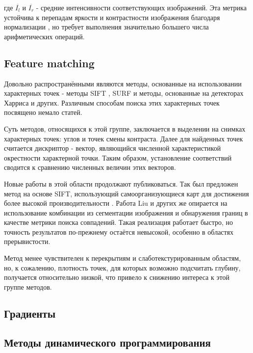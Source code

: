 где $\overline{I_l}$ и $\overline{I_r}$ - средние интенсивности соответствующих изображений. Эта метрика устойчива к перепадам яркости и контрастности изображения благодаря нормализации \cite{ncceval}, 
но требует выполнения значительно большего числа арифметических операций. 

\subsection{Feature matching}

Довольно распространёнными являются методы, основанные на использовании характерных точек - методы SIFT \cite{}, SURF \cite{} 
и методы, основанные на детекторах Харриса и других. Различным способам поиска этих характерных точек посвящено немало статей. 

Суть методов, относящихся к этой группе, заключается в выделении на снимках характерных точек: углов и точек смены контраста. Далее 
для найденных точек считается дискриптор - вектор, являющийся численной характеристикой окрестности характерной точки. Таким образом,
установление соответствий сводится к сравнению численных величин этих векторов. 

Новые работы в этой области продолжают публиковаться. Так был предложен метод на основе SIFT, использующий самоорганизующиеся карт для 	%
достижения более высокой производительности \cite{modsift}. Работа Liu и других \cite{ekstrand2015high} же опирается на использование комбинации из сегментации 
изображения и обнаружения границ в качестве метрики поиска совпадений. Такая реализация работает быстро, но точность результатов по-прежнему остаётся
невысокой, особенно в областях прерывистости. %

Метод менее чувствителен к перекрытиям и слаботекстурированным областям, 
но, к сожалению, плотность точек, для которых возможно подсчитать глубину, получается относительно низкой, что привело к снижению интереса 
к этой группе методов.

\subsection{Градиенты }


\subsection{Методы динамического программирования}

